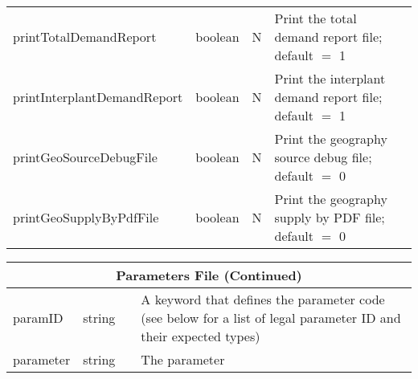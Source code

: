 \begin{minipage}{7.5in}
\begin{tabular}{lllp{3.5in}}
printTotalDemandReport & boolean & N & Print the total demand report file; 
      default $=$ 1 \\
printInterplantDemandReport & boolean & N & Print the interplant demand report file; 
      default $=$ 1 \\
printGeoSourceDebugFile & boolean & N & Print the geography source debug file;
      default $=$ 0 \\
printGeoSupplyByPdfFile & boolean & N & Print the geography supply by
      PDF file;  default $=$ 0 \\
\end{tabular}
\end{minipage}

\vspace{0.5in}

\begin{tabular}{lllp{3.5in}}
\multicolumn{4}{c}{{\bf Parameters File (Continued)}}\\ 
     \hline\hline
paramID    &  string &    &  A keyword that defines the parameter code
                          (see below for a list of legal parameter ID
                          and their expected types) \\
parameter  &  string   &  &  The parameter \\ \hline \hline
 

\end{tabular}
